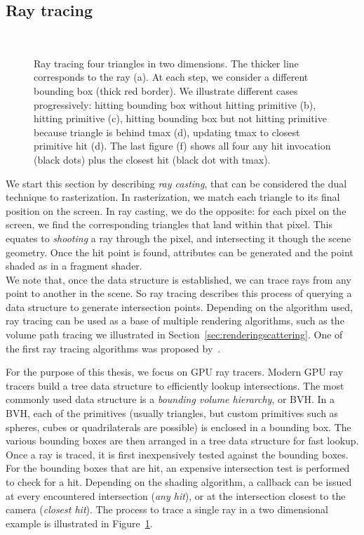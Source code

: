 \subsection{Ray tracing}
\label{sec:raytracing}
\begin{figure}
\centering
   \def\svgwidth{\textwidth}
    \\
\caption{Ray tracing four triangles in two dimensions. The thicker line corresponds to the ray (a). At each step, we consider a different bounding box (thick red border). We illustrate different cases progressively: hitting bounding box without hitting primitive (b), hitting primitive (c), hitting bounding box but not hitting primitive because triangle is behind tmax (d), updating tmax to closest primitive hit (d). The last figure (f) shows all four any hit invocation (black dots) plus the closest hit (black dot with tmax).} 
\label{fig:ray_tracing}
\end{figure}

We start this section by describing \emph{ray casting}, that can be considered the dual technique to rasterization. In rasterization, we match each triangle to its final position on the screen. In ray casting, we do the opposite: for each pixel on the screen, we find the corresponding triangles that land within that pixel. This equates to \emph{shooting} a ray through the pixel, and intersecting it though the scene geometry. Once the hit point is found, attributes can be generated and the point shaded as in a fragment shader. \\[1em]

We note that, once the data structure is established, we can trace rays from any point to another in the scene. So ray tracing describes this process of querying a data structure to generate intersection points. Depending on the algorithm used, ray tracing can be used as a base of multiple rendering algorithms, such as the volume path tracing we illustrated in Section~\ref{sec:renderingscattering}. One of the first ray tracing algorithms was proposed by~\citet{Appel1968}.

For the purpose of this thesis, we focus on GPU ray tracers. Modern GPU ray tracers build a tree data structure to efficiently lookup intersections. The most commonly used data structure is a \emph{bounding volume hierarchy}, or BVH. In a BVH, each of the primitives (usually triangles, but custom primitives such as spheres, cubes or quadrilaterals are possible) is enclosed in a bounding box. The various bounding boxes are then arranged in a tree data structure for fast lookup. Once a ray is traced, it is first inexpensively tested against the bounding boxes. For the bounding boxes that are hit, an expensive intersection test is performed to check for a hit. Depending on the shading algorithm, a callback can be issued at every encountered intersection (\emph{any hit}), or at the intersection closest to the camera (\emph{closest hit}). The process to trace a single ray in a two dimensional example is illustrated in Figure~\ref{fig:ray_tracing}. 

